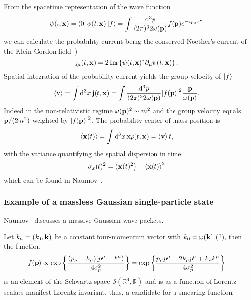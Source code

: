 From the spacetime representation of the wave function
\begin{equation}
	\psi(t,\vb{x})
	=
	\bra{0}\hat\phi(t,\vb{x})\ket{f}
	=
	\int\frac{\dd[3]{p}}{(2\pi)^32\omega(\vb{p})}
	f(\vb{p})e^{-ip_\mu x^\mu}
\end{equation}
we can calculate the probability current being the conserved Noether's current of the Klein-Gordon field~\cite[p.~18]{Peskin1995})
\begin{equation}
	j_\mu(t,\vb{x})
	=
	2
	\operatorname{\operatorname{Im}}\left\{
		\psi(t,\vb{x})^*
		\partial_\mu
		\psi(t,\vb{x})
	\right\}
	\label{eq:qkg_probability_current}.
\end{equation}
Spatial integration of the probability current yields the group velocity of $\ket{f}$
\begin{equation}
	\expval{\vb{v}}
	=
	\int\dd[3]{x}
	\vb{j}(t,\vb{x})
	=
	\int\frac{\dd[3]{p}}{(2\pi)^32\omega(\vb{p})}
	\abs{f(\vb{p})}^2
	\frac{\vb{p}}{\omega(\vb{p})}
	\label{qkg:group_velocity}.
\end{equation}
Indeed in the non-relativistic regime $\omega(\vb{p})^2\sim m^2$
and the group velocity equals $\vb{p}/(2m^2)$ weighted by $\abs{f(\vb{p})}^2$.
The probability center-of-mass position is
\begin{equation}
	\expval{\vb{x}(t)}
	=
	\int\dd[3]{x}\vb{x}\rho(t,\vb{x})
	=
	\expval{\vb{v}}t
	,
\end{equation}
with the variance quantifying the spatial dispersion in time
\begin{equation}
	\sigma_x(t)^2
	=
	\expval{\vb{x}(t)^2}
	-
	\expval{\vb{x}(t)}^2
\end{equation}
which can be found in Naumov~\cite{Naumov2013}.

\subsubsection{Example of a massless Gaussian single-particle state}

Naumov~\cite{Naumov2013} discusses a massive Gaussian wave packets.

Let $k_\mu=(k_0,\vb{k})$ be a constant four-momentum vector with $k_0=\omega(\vb{k})$ (?), then the function
\begin{equation}
	f(\vb{p})
	\propto
	\exp\left\{
		\frac{(p_\mu-k_\mu)(p^\mu-k^\mu)}{4\sigma_p^2}
	\right\}
	=
	\exp\left\{
		\frac{p_\mu p^\mu-2k_\mu p^\mu+k_\mu k^\mu}{4\sigma_p^2}
	\right\}
\end{equation}
is an element of the Schwartz space $\mathcal{S}(\mathbb{R}^4,\mathbb{R})$ and is as a function of Lorentz scalars manifest Lorentz invariant, thus, a candidate for a smearing function.

